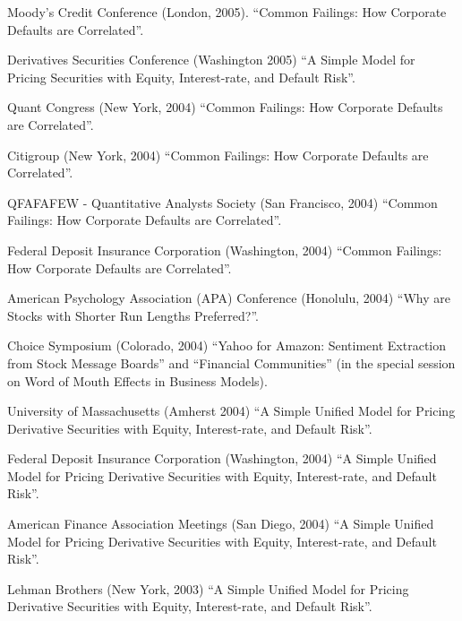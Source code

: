 \documentclass{article}
\begin{document}
\begin{etaremune}
{\item Moody's Credit Conference (London, 2005). 
``Common Failings: How Corporate Defaults are Correlated''. 


\item Derivatives Securities Conference (Washington 2005) 
``A Simple Model for Pricing  Securities with
Equity, Interest-rate, and Default Risk''.


\item Quant Congress (New York, 2004) 
  ``Common Failings: How Corporate Defaults are Correlated''.
  
\item Citigroup (New York, 2004) 
  ``Common Failings: How Corporate Defaults are Correlated''.

\item QFAFAFEW - Quantitative Analysts Society (San Francisco, 2004)
  ``Common Failings: How Corporate Defaults are Correlated''.


\item Federal Deposit Insurance Corporation (Washington, 2004)  
``Common Failings: How Corporate Defaults are Correlated''.

  
\item American Psychology Association (APA) Conference (Honolulu,
  2004) ``Why are Stocks with Shorter Run Lengths Preferred?''.
  
\item Choice Symposium (Colorado, 2004) ``Yahoo for Amazon: Sentiment
  Extraction from Stock Message Boards'' and ``Financial Communities''
  (in the special session on Word of Mouth Effects in Business
  Models).

\item University of Massachusetts (Amherst 2004) 
``A Simple Unified Model for Pricing Derivative Securities with
Equity, Interest-rate, and Default Risk''.

\item Federal Deposit Insurance Corporation (Washington, 2004)  
``A Simple Unified Model for Pricing Derivative Securities with
Equity, Interest-rate, and Default Risk''.


\item American Finance Association Meetings (San Diego, 2004)  
``A Simple Unified Model for Pricing Derivative Securities with
Equity, Interest-rate, and Default Risk''.


\item Lehman Brothers (New York, 2003)
``A Simple Unified Model for Pricing Derivative Securities with
Equity, Interest-rate, and Default Risk''.

}
\end{etaremune}
\end{document}
